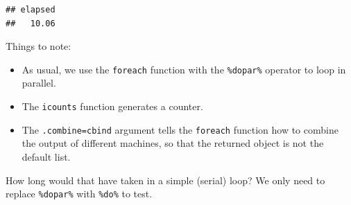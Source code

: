 \documentclass[]{book}
\newenvironment{Shaded}{\begin{snugshade}}{\end{snugshade}}
\newcommand{\KeywordTok}[1]{\textcolor[rgb]{0.13,0.29,0.53}{\textbf{#1}}}
\newcommand{\DataTypeTok}[1]{\textcolor[rgb]{0.13,0.29,0.53}{#1}}
\newcommand{\DecValTok}[1]{\textcolor[rgb]{0.00,0.00,0.81}{#1}}
\newcommand{\FloatTok}[1]{\textcolor[rgb]{0.00,0.00,0.81}{#1}}
\newcommand{\StringTok}[1]{\textcolor[rgb]{0.31,0.60,0.02}{#1}}
\newcommand{\OtherTok}[1]{\textcolor[rgb]{0.56,0.35,0.01}{#1}}
\newcommand{\OperatorTok}[1]{\textcolor[rgb]{0.81,0.36,0.00}{\textbf{#1}}}
\newcommand{\NormalTok}[1]{#1}
\providecommand{\tightlist}{%
  \setlength{\itemsep}{0pt}\setlength{\parskip}{0pt}}
\theoremstyle{definition}
\theoremstyle{definition}
\theoremstyle{definition}
\theoremstyle{remark}
\begin{document}
\begin{Shaded}
\end{Shaded}

\begin{verbatim}
## elapsed 
##   10.06
\end{verbatim}

Things to note:

\begin{itemize}
\tightlist
\item
  As usual, we use the \texttt{foreach} function with the
  \texttt{\%dopar\%} operator to loop in parallel.
\item
  The \texttt{icounts} function generates a counter.
\item
  The \texttt{.combine=cbind} argument tells the \texttt{foreach}
  function how to combine the output of different machines, so that the
  returned object is not the default list.
\end{itemize}

How long would that have taken in a simple (serial) loop? We only need
to replace \texttt{\%dopar\%} with \texttt{\%do\%} to test.
\end{document}
